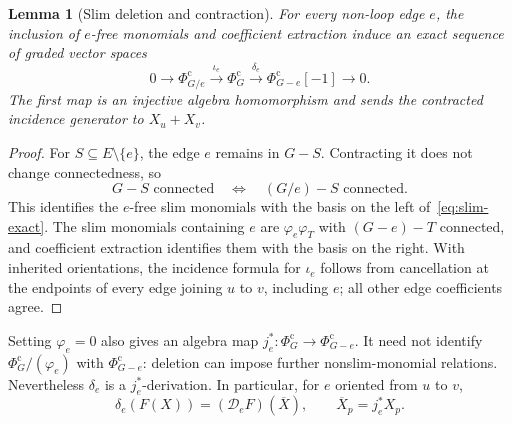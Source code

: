 \documentclass[reqno]{article}
\theoremstyle{plain} %
\newtheorem{lemma}[theorem]{Lemma}
\theoremstyle{definition}
\theoremstyle{remark}
\numberwithin{equation}{section}
\begin{document}
\begin{lemma}[Slim deletion and contraction]\label{lem:slim-exact}
For every non-loop edge $e$, the inclusion of $e$-free monomials and
coefficient extraction induce an exact sequence of graded vector spaces
\begin{equation}\label{eq:slim-exact}
0\longrightarrow\Phi_{G/e}^{\mathrm c}
\xrightarrow{\iota_e}\Phi_G^{\mathrm c}
\xrightarrow{\delta_e}\Phi_{G-e}^{\mathrm c}[-1]
\longrightarrow0.
\end{equation}
The first map is an injective algebra homomorphism and sends the
contracted incidence generator to $X_u+X_v$.
\end{lemma}
\begin{proof}
For $S\subseteq E\setminus\{e\}$, the edge $e$ remains in $G-S$.
Contracting it does not change connectedness, so
\[
G-S\text{ connected}\quad\Longleftrightarrow\quad
(G/e)-S\text{ connected}.
\]
This identifies the $e$-free slim monomials with the basis on the left
of~\eqref{eq:slim-exact}. The slim monomials containing $e$ are
$\varphi_e\varphi_T$ with $(G-e)-T$ connected, and coefficient
extraction identifies them with the basis on the right.
With inherited orientations, the incidence formula for $\iota_e$
follows from cancellation at the endpoints of every edge joining
$u$ to $v$, including $e$; all other edge coefficients agree.
\end{proof}

Setting $\varphi_e=0$ also gives an algebra map
$j_e^*: \Phi_G^{\mathrm c}\to\Phi_{G-e}^{\mathrm c}$.
It need not identify $\Phi_G^{\mathrm c}/(\varphi_e)$ with
$\Phi_{G-e}^{\mathrm c}$: deletion can impose further nonslim-monomial
relations. Nevertheless $\delta_e$ is a $j_e^*$-derivation. In
particular, for $e$ oriented from $u$ to $v$,
\begin{equation}\label{eq:central-chain-rule}
\delta_e(F(X))=(\mathcal D_eF)(\overline X),\qquad
\overline X_p=j_e^*X_p.
\end{equation}
\end{document}
